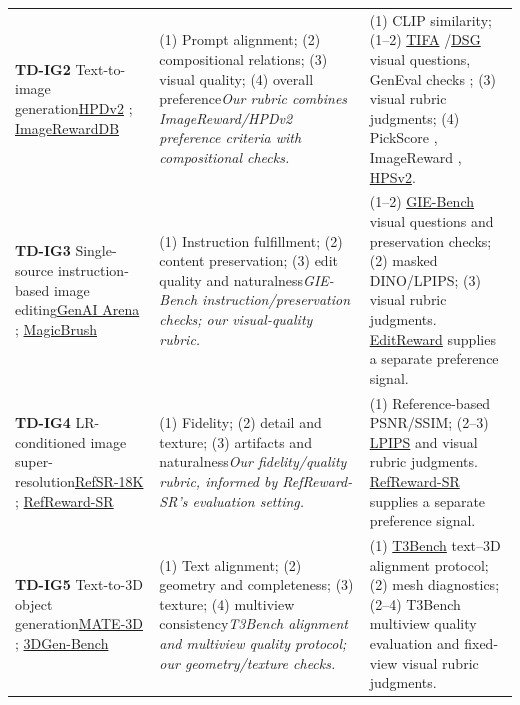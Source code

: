 \begin{longtable}{@{}P{3.45cm}P{3.55cm}P{5.68cm}@{}}
\textbf{TD-IG2} Text-to-image generation\newline \href{https://huggingface.co/datasets/ymhao/HPDv2}{HPDv2} \citep{wu2023hpsv2}; \href{https://huggingface.co/datasets/zai-org/ImageRewardDB}{ImageRewardDB} & (1) Prompt alignment; (2) compositional relations; (3) visual quality; (4) overall preference\newline\emph{Our rubric combines ImageReward/HPDv2 preference criteria with compositional checks.} & (1) CLIP similarity; (1--2) \href{https://arxiv.org/abs/2303.11897}{TIFA} \citep{hu2023tifa}/\href{https://arxiv.org/abs/2310.18235}{DSG} \citep{cho2024dsg} visual questions, GenEval checks \citep{ghosh2023geneval}; (3) visual rubric judgments; (4) PickScore \citep{kirstain2023pickapic}, ImageReward \citep{xu2023imagereward}, \href{https://github.com/tgxs002/HPSv2}{HPSv2}.\\
\addlinespace
\textbf{TD-IG3} Single-source instruction-based image editing\newline \href{https://huggingface.co/datasets/TIGER-Lab/GenAI-Bench}{GenAI Arena} \citep{jiang2024genaiarena}; \href{https://huggingface.co/datasets/osunlp/MagicBrush}{MagicBrush} \citep{zhang2023magicbrush} & (1) Instruction fulfillment; (2) content preservation; (3) edit quality and naturalness\newline\emph{GIE-Bench instruction/preservation checks; our visual-quality rubric.} & (1--2) \href{https://arxiv.org/abs/2505.11493}{GIE-Bench} \citep{qian2025gie} visual questions and preservation checks; (2) masked DINO/LPIPS; (3) visual rubric judgments. \href{https://arxiv.org/abs/2509.26346}{EditReward} \citep{wu2026editreward} supplies a separate preference signal.\\
\addlinespace
\textbf{TD-IG4} LR-conditioned image super-resolution\newline \href{https://huggingface.co/datasets/casyssong/RefSR-18K}{RefSR-18K} \citep{song2026refsr}; \href{https://github.com/yushuaisong/RefReward-SR}{RefReward-SR} & (1) Fidelity; (2) detail and texture; (3) artifacts and naturalness\newline\emph{Our fidelity/quality rubric, informed by RefReward-SR's evaluation setting.} & (1) Reference-based PSNR/SSIM; (2--3) \href{https://github.com/richzhang/PerceptualSimilarity}{LPIPS} \citep{zhang2018lpips} and visual rubric judgments. \href{https://github.com/yushuaisong/RefReward-SR}{RefReward-SR} supplies a separate preference signal.\\
\addlinespace
\textbf{TD-IG5} Text-to-3D object generation\newline \href{https://huggingface.co/datasets/ccccby/MATE-3D}{MATE-3D} \citep{zhang2025mate3d}; \href{https://huggingface.co/datasets/3DGen/3DGen-Bench}{3DGen-Bench} \citep{zhang20253dgen} & (1) Text alignment; (2) geometry and completeness; (3) texture; (4) multiview consistency\newline\emph{T3Bench alignment and multiview quality protocol; our geometry/texture checks.} & (1) \href{https://arxiv.org/abs/2310.02977}{T3Bench} \citep{he2023t3bench} text--3D alignment protocol; (2) mesh diagnostics; (2--4) T3Bench multiview quality evaluation and fixed-view visual rubric judgments.\\

\end{longtable}

